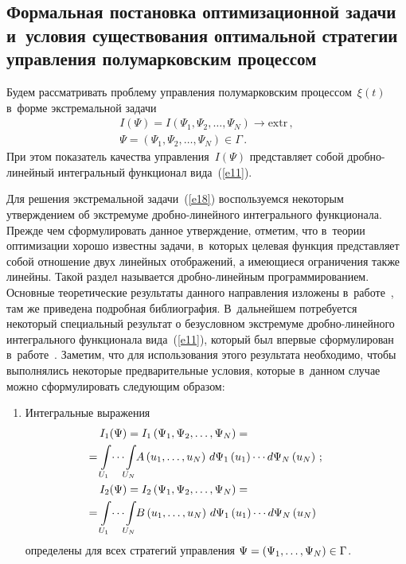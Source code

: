 \begin{multicols}{2}
\section{Формальная постановка оптимизационной задачи 
и~условия существования оптимальной стратегии управления полумарковским процессом}

Будем рассматривать проблему управления полумарковским процессом~$\xi(t)$ в~форме 
экстремальной задачи
\begin{multline}
I(\Psi)=I\left(\Psi_1, \Psi_2,\ldots,\Psi_N\right)\rightarrow \mathrm{extr}\,,
\\
\Psi=\left(\Psi_1, \Psi_2,\ldots,\Psi_N\right)\in\Gamma\,. \label{e18}
\end{multline}
При этом показатель качества управления~$I(\Psi)$ представляет собой 
дроб\-но-ли\-ней\-ный интегральный функционал вида~(\ref{e11}).

Для решения экстремальной задачи~(\ref{e18}) воспользуемся некоторым утверждением 
об экстремуме дроб\-но-ли\-ней\-но\-го интегрального функционала. Прежде 
чем сформулировать данное утверждение, отметим, что в~теории оптимизации 
хорошо известны задачи, в~которых целевая функция представляет собой 
отношение двух линейных отображений, а имеющиеся ограничения также линейны. 
Такой раздел называется дроб\-но-ли\-ней\-ным программированием. Основные
 теоретические результаты данного направления изложены в~работе~\cite{23},
  там же приведена подробная библиография. В~дальнейшем потребуется некоторый 
  специальный результат о безусловном экстремуме дроб\-но-ли\-ней\-но\-го 
  интегрального функционала вида~(\ref{e11}), который был впервые сформулирован 
  в~работе~\cite{14}. Заметим, что для использования этого результата необходимо, 
  чтобы выполнялись некоторые предварительные условия, которые в~данном случае 
  можно сформулировать следующим образом:
\begin{enumerate}[1.]
\item Интегральные выражения
\begin{align*}
I_1(\Psi)&=I_1\left(\Psi_1,\Psi_2,\ldots,\Psi_N\right)={}&\\
&\hspace*{-13mm}{}=\int\limits_{U_1}\!\cdots\!
\int\limits_{U_N}\!\!A\left(u_1,\ldots ,u_N\right)\,
d\Psi_1\left(u_1\right) %
\cdots
 d\Psi_N\left(u_N\right)\,;
\\
I_2(\Psi)&=I_2\left(\Psi_1,\Psi_2,\ldots,\Psi_N\right)={}&\\
&\hspace*{-13mm}{}=\int\limits_{U_1}\!\cdots\!\int\limits_{U_N}\!\!
B\left(u_1,\ldots,u_N\right)\,
d\Psi_1\left(u_1\right)%
\cdots d\Psi_N\left(u_N\right)
\end{align*}
определены для всех стратегий управления $\Psi\hm=(\Psi_1, \ldots,\Psi_N)
\hm\in \Gamma$.


\end{enumerate}
\end{multicols}
